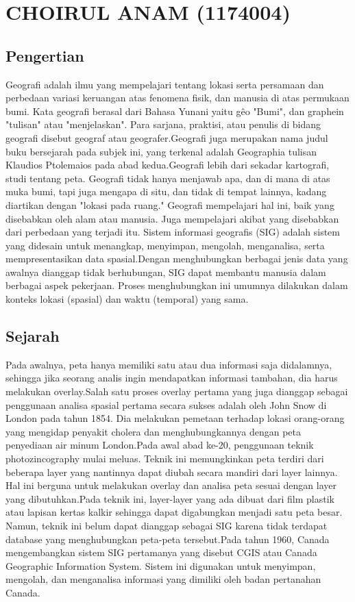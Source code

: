 \section{CHOIRUL ANAM (1174004)}
\subsection{Pengertian}
Geografi adalah ilmu yang mempelajari tentang lokasi serta persamaan dan perbedaan variasi keruangan atas fenomena fisik, dan manusia di atas permukaan bumi. Kata geografi berasal dari Bahasa Yunani yaitu gêo "Bumi", dan graphein "tulisan" atau "menjelaskan". Para sarjana, praktisi, atau penulis di bidang geografi disebut geograf atau geografer.Geografi juga merupakan nama judul buku bersejarah pada subjek ini, yang terkenal adalah Geographia tulisan Klaudios Ptolemaios pada abad kedua.Geografi lebih dari sekadar kartografi, studi tentang peta. Geografi tidak hanya menjawab apa, dan di mana di atas muka bumi, tapi juga mengapa di situ, dan tidak di tempat lainnya, kadang diartikan dengan "lokasi pada ruang." Geografi mempelajari hal ini, baik yang disebabkan oleh alam atau manusia. Juga mempelajari akibat yang disebabkan dari perbedaan yang terjadi itu.
Sistem informasi geografis (SIG) adalah sistem yang didesain untuk menangkap, menyimpan, mengolah, menganalisa, serta mempresentasikan data spasial.Dengan menghubungkan berbagai jenis data yang awalnya dianggap tidak berhubungan, SIG dapat membantu manusia dalam berbagai aspek pekerjaan. Proses menghubungkan ini umumnya dilakukan dalam konteks lokasi (spasial) dan waktu (temporal) yang sama.
\subsection{Sejarah}
Pada awalnya, peta hanya memiliki satu atau dua informasi saja didalamnya, sehingga jika seorang analis ingin mendapatkan informasi tambahan, dia harus melakukan overlay.Salah satu proses overlay pertama yang juga dianggap sebagai penggunaan analisa spasial pertama secara sukses adalah oleh John Snow di London pada tahun 1854. Dia melakukan pemetaan terhadap lokasi orang-orang yang mengidap penyakit cholera dan menghubungkannya dengan peta penyediaan air minum London.Pada awal abad ke-20, penggunaan teknik photozincography mulai meluas. Teknik ini memungkinkan peta terdiri dari beberapa layer yang nantinnya dapat diubah secara mandiri dari layer lainnya. Hal ini berguna untuk melakukan overlay dan analisa peta sesuai dengan layer yang dibutuhkan.Pada teknik ini, layer-layer yang ada dibuat dari film plastik atau lapisan kertas kalkir sehingga dapat digabungkan menjadi satu peta besar. Namun, teknik ini belum dapat dianggap sebagai SIG karena tidak terdapat database yang menghubungkan peta-peta tersebut.Pada tahun 1960, Canada mengembangkan sistem SIG pertamanya yang disebut CGIS atau Canada Geographic Information System. Sistem ini digunakan untuk menyimpan, mengolah, dan menganalisa informasi yang dimiliki oleh badan pertanahan Canada.
